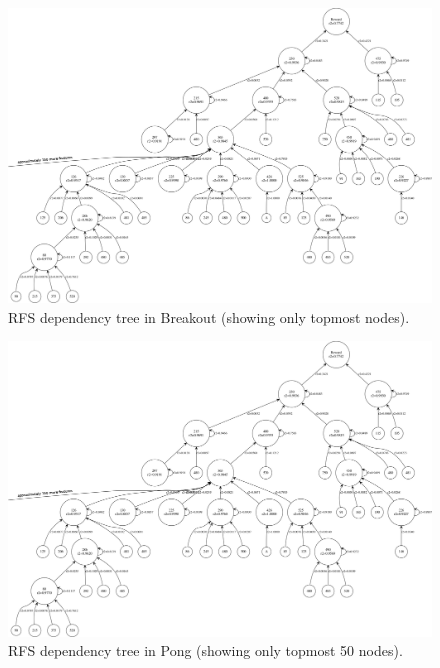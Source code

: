 \begin{figure}
    \includegraphics[width=\textwidth]{pictures/experiments/rfs_tree_top_pong}
    \centering
    \caption[RFS dependency tree in Breakout]{RFS dependency tree in Breakout 
	     (showing only topmost nodes).}
    \label{f:rfs_tree_breakout}
\end{figure}
%
%
\begin{figure}
    \includegraphics[width=\textwidth]{pictures/experiments/rfs_tree_top_pong}
    \centering
    \caption[RFS dependency tree in Pong]{RFS dependency tree in Pong 
	     (showing only topmost 50 nodes).}
    \label{f:rfs_tree_pong}
\end{figure}
%
%
